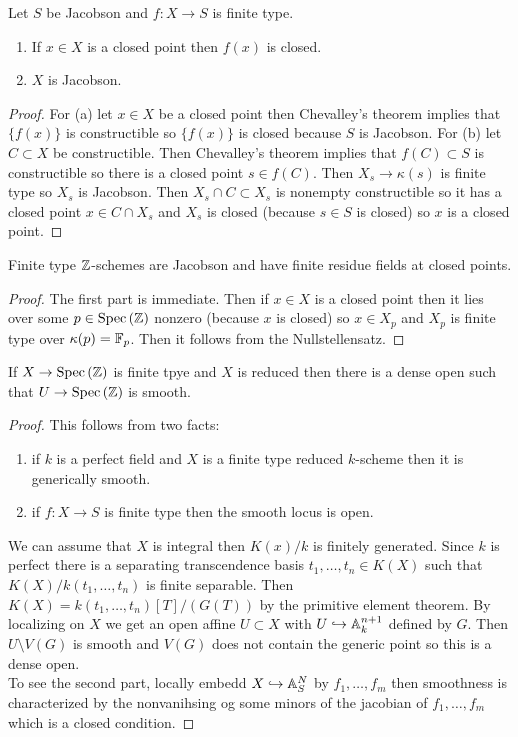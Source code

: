\documentclass[12pt]{article}
\begin{document}
\begin{prop}
Let $S$ be Jacobson and $f : X \to S$ is finite type. 
\begin{enumerate}
\item If $x \in X$ is a closed point then $f(x)$ is closed.
\item $X$ is Jacobson.
\end{enumerate}
\end{prop}

\begin{proof}
For (a) let $x \in X$ be a closed point then Chevalley's theorem implies that $\{ f(x) \}$ is constructible so $\{ f(x) \}$ is closed because $S$ is Jacobson. For (b) let $C \subset X$ be constructible. Then Chevalley's theorem implies that $f(C) \subset S$ is constructible so there is a closed point $s \in f(C)$. Then $X_s \to \kappa(s)$ is finite type so $X_s$ is Jacobson. Then $X_s \cap C \subset X_s$ is nonempty constructible so it has a closed point $x \in C \cap X_s$ and $X_s$ is closed (because $s \in S$ is closed) so $x$ is a closed point.
\end{proof}

\begin{cor}
Finite type $\mathbb{Z}$-schemes are Jacobson and have finite residue fields at closed points.
\end{cor}

\begin{proof}
The first part is immediate. Then if $x \in X$ is a closed point then it lies over some $p \in \mathrm{Spec}\left( \mathbb{Z} \right)$ nonzero (because $x$ is closed) so $x \in X_p$ and $X_p$ is finite type over $\kappa(p) = \mathbb{F}_p$. Then it follows from the Nullstellensatz.
\end{proof}

\begin{prop}
If $X \to \mathrm{Spec}\left( \mathbb{Z} \right)$ is finite tpye and $X$ is reduced then there is a dense open such that $U \to \mathrm{Spec}\left( \mathbb{Z} \right)$ is smooth.
\end{prop}

\begin{proof}
This follows from two facts:
\begin{enumerate}
\item if $k$ is a perfect field and $X$ is a finite type reduced $k$-scheme then it is generically smooth.
\item if $f : X \to S$ is finite type then the smooth locus is open. 
\end{enumerate}
We can assume that $X$ is integral then $K(x) / k$ is finitely generated. Since $k$ is perfect there is a separating transcendence basis $t_1, \dots, t_n \in K(X)$ such that $K(X) / k(t_1, \dots, t_n)$ is finite separable. Then $K(X) = k(t_1, \dots, t_n)[T]/(G(T))$ by the primitive element theorem. By localizing on $X$ we get an open affine $U \subset X$ with $U \hookrightarrow \mathbb{A}^{n+1}_k$ defined by $G$. Then $U \setminus V(G)$ is smooth and $V(G)$ does not contain the generic point so this is a dense open.
\bigskip\\
To see the second part, locally embedd $X \hookrightarrow \mathbb{A}^N_S$ by $f_1, \dots, f_m$ then smoothness is characterized by the nonvanihsing og some minors of the jacobian of $f_1, \dots, f_m$ which is a closed condition. 
\end{proof}
\end{document}
